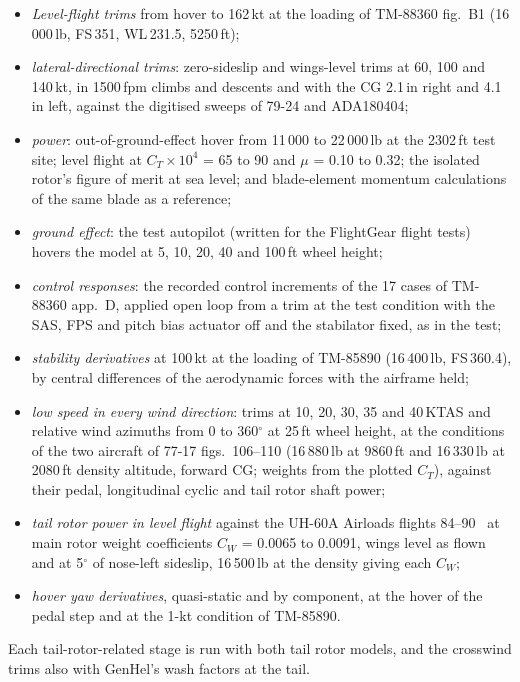 \documentclass[10pt,a4paper,twocolumn]{article}
\begin{document}
\begin{itemize}
\item \emph{Level-flight trims} from hover to 162\,kt at the loading of TM-88360 fig.~B1 (16\,000\,lb, FS\,351, WL\,231.5, 5250\,ft);
\item \emph{lateral-directional trims}: zero-sideslip and wings-level trims at 60, 100 and 140\,kt, in 1500\,fpm climbs and descents
and with the CG 2.1\,in right and 4.1\,in left, against the digitised sweeps of 79-24 and ADA180404;
\item \emph{power}: out-of-ground-effect hover from 11\,000 to 22\,000\,lb at the 2302\,ft test site; level flight at $C_T\times10^4$
= 65 to 90 and $\mu$ = 0.10 to 0.32; the isolated rotor's figure of merit at sea level; and blade-element momentum calculations of
the same blade as a reference;
\item \emph{ground effect}: the test autopilot (written for the FlightGear flight tests) hovers the model at 5, 10, 20, 40 and 100\,ft
wheel height;
\item \emph{control responses}: the recorded control increments of the 17 cases of TM-88360 app.~D, applied open loop from a
trim at the test condition with the SAS, FPS and pitch bias actuator off and the stabilator fixed, as in the test;
\item \emph{stability derivatives} at 100\,kt at the loading of TM-85890 (16\,400\,lb, FS\,360.4), by central differences of the
aerodynamic forces with the airframe held;
\item \emph{low speed in every wind direction}: trims at 10, 20, 30, 35 and 40\,KTAS and relative wind azimuths from 0 to 360$^\circ$ at
25\,ft wheel height, at the conditions of the two aircraft of 77-17 figs.~106--110 (16\,880\,lb at 9860\,ft and 16\,330\,lb at 2080\,ft
density altitude, forward CG; weights from the plotted $C_T$), against their pedal, longitudinal cyclic and tail rotor shaft power;
\item \emph{tail rotor power in level flight} against the UH-60A Airloads flights 84--90~\cite{perf} at main rotor weight coefficients
$C_W$ = 0.0065 to 0.0091, wings level as flown and at 5$^\circ$ of nose-left sideslip, 16\,500\,lb at the density giving each $C_W$;
\item \emph{hover yaw derivatives}, quasi-static and by component, at the hover of the pedal step and at the 1-kt condition of TM-85890.
\end{itemize}
Each tail-rotor-related stage is run with both tail rotor models, and the crosswind trims also with GenHel's wash factors at the tail.
\end{document}
